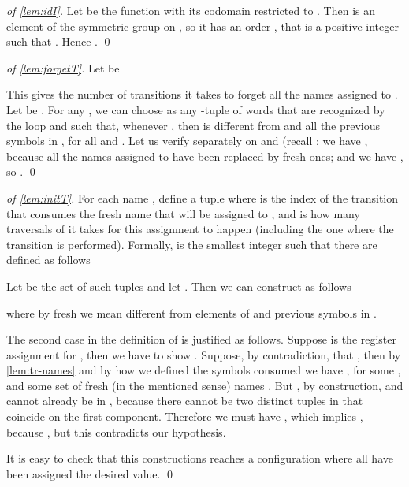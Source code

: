 \begin{proof}[of \cref{lem:idI}]\hfill

\item Let  be the function  with its codomain restricted to . Then  is an element of the symmetric group on , so it has an order , that is a positive integer such that . Hence .
\qed
\end{proof}

\begin{proof}[of \cref{lem:forgetT}]
Let  be

This gives the number of transitions it takes to forget all the names assigned to . Let  be . For any , we can choose  as any -tuple of words that are recognized by the loop and such that, whenever , then  is different from  and all the previous symbols in , for all  and . Let us verify  separately on  and  (recall : we have , because all the names assigned to  have been replaced by fresh ones; and we have , so .
\qed
\end{proof}


\begin{proof}[of \cref{lem:initT}]
For each name , define a tuple  where  is the index of the transition that consumes the fresh name that will be assigned to , and  is how many traversals of  it takes for this assignment to happen (including the one where the transition  is performed). Formally,  is the smallest integer such that there are  defined as follows

Let  be the set of such tuples and let . Then we can construct  as follows

where by  fresh we mean different from elements of  and previous symbols in .

The second case in the definition of  is justified as follows. Suppose  is the register assignment for , then we have to show . Suppose, by contradiction, that , then by \cref{lem:tr-names} and by how we defined the symbols consumed we have , for some , and some set of fresh (in the mentioned sense) names .
But , by construction, and  cannot already be in , because there cannot be two distinct tuples in  that coincide on the first component. Therefore we must have
, which implies , because , but this contradicts our hypothesis.


It is easy to check that this constructions reaches a configuration where all  have been assigned the desired value. 
\qed
\end{proof}